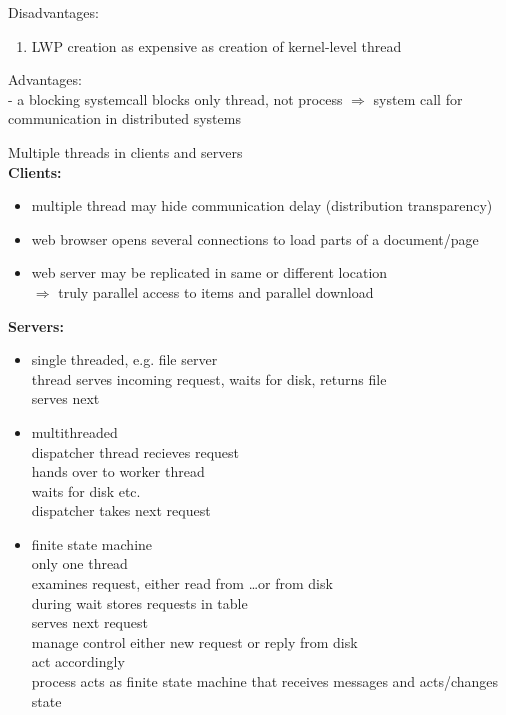 \documentclass[ngerman,a4paper]{report}
\begin{document}
Disadvantages:\\
\begin{enumerate}
\item LWP creation as expensive as creation of kernel-level thread
\end{enumerate}

Advantages:\\
- a blocking systemcall blocks only thread, not process
$\Rightarrow$ system call for communication in distributed systems

Multiple threads in clients and servers\\

\textbf{Clients:}\\
\begin{itemize}
\item multiple thread may hide communication delay (distribution transparency)
\item web browser opens several connections to load parts of a document/page
\item web server may be replicated in same or different location\\
$\Rightarrow$ truly parallel access to items and parallel download
\end{itemize}

\textbf{Servers:}\\
\begin{itemize}
\item single threaded, e.g. file server\\
thread serves incoming request, waits for disk, returns file\\
serves next
\item multithreaded\\
dispatcher thread recieves request\\
hands over to worker thread\\
waits for disk etc.\\
dispatcher takes next request
\item finite state machine\\
only one thread\\
examines request, either read from \ldots or from disk\\
during wait stores requests in table\\
serves next request\\
manage control either new request or reply from disk\\
act accordingly\\
process acts as finite state machine that receives messages and acts/changes state
\end{itemize}
\end{document}
